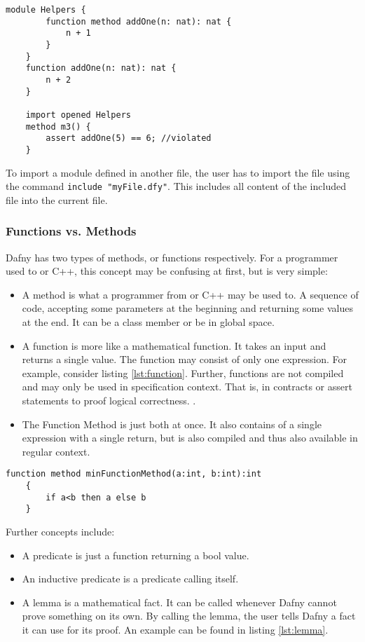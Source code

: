 \begin{lstlisting}[caption={Naming Clash}, captionpos=b, label={lst:moduleShadowing}]
    module Helpers {
        function method addOne(n: nat): nat {
            n + 1
        }
    }
    function addOne(n: nat): nat {
        n + 2
    }

    import opened Helpers
    method m3() {
        assert addOne(5) == 6; //violated
    }

\end{lstlisting}

To import a module defined in another file, the user has to import the file using the command \texttt{include "myFile.dfy"}. This includes all content of the included file into the current file.

\subsubsection{Functions vs. Methods}
Dafny has two types of methods, or functions respectively. For a programmer used to \Csharp or C++, this concept may be confusing at first, but is very simple:
\begin{itemize}
\item A method is what a programmer from \Csharp or C++ may be used to. A sequence of code, accepting some parameters at the beginning and returning some values at the end. It can be a class member or be in global space.
\item A function is more like a mathematical function. It takes an input and returns a single value. The function may consist of only one expression. For example, consider listing \ref{lst:function}. Further, functions are not compiled and may only be used in specification context. That is, in contracts or assert statements to proof logical correctness. \cite{functionVSMethod}.
\item The Function Method is just both at once. It also contains of a single expression with a single return, but is also compiled and thus also available in regular context. \cite{functionVSMethod}
\end{itemize}

\begin{lstlisting}[caption={Function}, captionpos=b, label={lst:function}]
    function method minFunctionMethod(a:int, b:int):int
    {
        if a<b then a else b
    }
\end{lstlisting}

Further concepts include:
\begin{itemize}
\item A predicate is just a function returning a bool value.
\item An inductive predicate is a predicate calling itself.
\item A lemma is a mathematical fact. It can be called whenever Dafny cannot prove something on its own. By calling the lemma, the user tells Dafny a fact it can use for its proof. An example can be found in listing \ref{lst:lemma}. \cite{dafnyReferenceManual}
\end{itemize}

